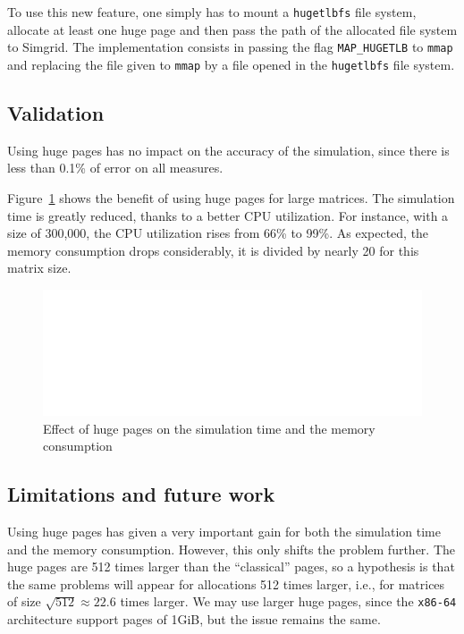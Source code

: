 \documentclass[12pt, a4paper]{memoir}
\begin{document}
To use this new feature, one simply has to mount a \texttt{hugetlbfs} file system, allocate at least one huge page and then
pass the path of the allocated file system to Simgrid.  The implementation consists in passing the flag \texttt{MAP\_HUGETLB}
to \texttt{mmap} and replacing the file given to \texttt{mmap} by a file opened in the \texttt{hugetlbfs} file system.

\subsection{Validation}
\label{sec:org63ce55e}
Using huge pages has no impact on the accuracy of the simulation, since there is less than 0.1\% of error on all
measures.

Figure~\ref{fig:hugepage_metrics} shows the benefit of using huge pages for large matrices. The simulation time is greatly
reduced, thanks to a better CPU utilization. For instance, with a size of 300,000, the CPU utilization rises from
66\% to 99\%.  As expected, the memory consumption drops considerably, it is divided by nearly 20 for this matrix
size.
\begin{figure}[htpb]
\centering
\includegraphics[width=\linewidth,page=2]{../validation/hugepage/report_plot.pdf}
\caption{Effect of huge pages on the simulation time and the memory consumption}
\label{fig:hugepage_metrics}
\end{figure}

\subsection{Limitations and future work}
\label{sec:org532cb28}
Using huge pages has given a very important gain for both the simulation time and the memory consumption. However,
this only shifts the problem further. The huge pages are 512 times larger than the “classical” pages, so a
hypothesis is that the same problems will appear for allocations 512 times larger, i.e., for matrices of size
\(\sqrt{512} \approx 22.6\) times larger. We may use larger huge pages, since the \texttt{x86-64} architecture support pages of 1GiB,
but the issue remains the same.
\end{document}
